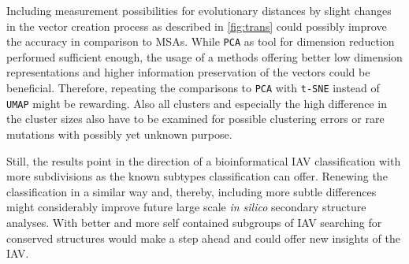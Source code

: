 \vspace{1em}

Including measurement possibilities for evolutionary distances by slight changes in the vector creation process as described in \autoref{fig:trans} could possibly improve the accuracy in comparison to \glspl{MSA}. %
While \texttt{PCA} as tool for dimension reduction performed sufficient enough, the usage of a methods offering better low dimension representations and higher information preservation of the vectors could be beneficial. Therefore, repeating the comparisons to \texttt{PCA} with \texttt{t-SNE} instead of \texttt{UMAP} might be rewarding. Also all clusters and especially the high difference in the cluster sizes also have to be examined for possible clustering errors or rare mutations with possibly yet unknown purpose. 

\vspace{1em}

Still, the results point in the direction of a bioinformatical \gls{IAV} classification with more subdivisions as the known subtypes classification can offer. Renewing the classification in a similar way and, thereby, including more subtle differences might considerably improve future large scale  \textit{in silico} secondary structure analyses. With better and more self contained subgroups of \gls{IAV} searching for conserved structures would make a step ahead and could offer new insights of the \gls{IAV}.






